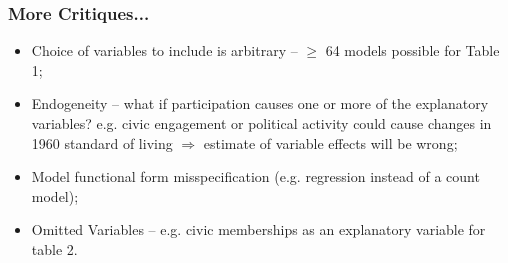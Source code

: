 \documentclass[aspectratio=169]{beamer}
\theoremstyle{principle}
\begin{document}
\begin{frame}
\frametitle{More Critiques...}
\begin{itemize}
\item Choice of variables to include is arbitrary -- $\geq$ 64 models possible for Table 1;
\bigskip
\item Endogeneity -- what if participation causes one or more of the explanatory variables?  e.g. civic engagement or political activity could cause changes in 1960 standard of living $\Rightarrow$ estimate of variable effects will be wrong;
\bigskip
\item Model functional form misspecification (e.g. regression instead of a count model);
\bigskip
\item Omitted Variables -- e.g. civic memberships as an explanatory variable for table 2.

\end{itemize}
\end{frame}
\end{document}
